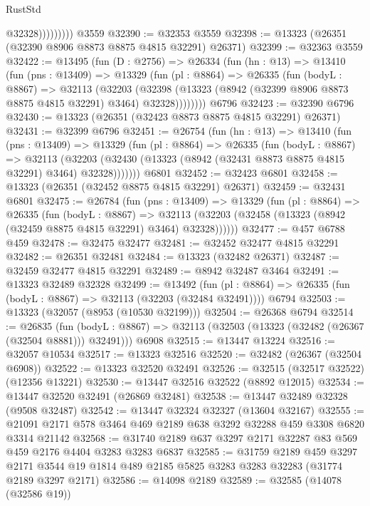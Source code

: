 \begin{lexlean}{RustStd}
\begin{coremodule}
                      @32328)))))))))
    @3559
@32390 := @32353 @3559
@32398 := @13323 (@26351 (@32390 @8906 @8873 @8875 @4815 @32291) @26371)
@32399 := @32363 @3559
@32422 := @13495
    (fun (D : @2756) =>
    @26334
      (fun (hn : @13) =>
      @13410
        (fun (pns : @13409) =>
        @13329
          (fun (pl : @8864) =>
          @26335
            (fun (bodyL : @8867) =>
            @32113
              (@32203
                (@32398 (@13323 (@8942 (@32399 @8906 @8873 @8875 @4815 @32291) @3464) @32328))))))))
    @6796
@32423 := @32390 @6796
@32430 := @13323 (@26351 (@32423 @8873 @8875 @4815 @32291) @26371)
@32431 := @32399 @6796
@32451 := @26754
    (fun (hn : @13) =>
    @13410
      (fun (pns : @13409) =>
      @13329
        (fun (pl : @8864) =>
        @26335
          (fun (bodyL : @8867) =>
          @32113
            (@32203 (@32430 (@13323 (@8942 (@32431 @8873 @8875 @4815 @32291) @3464) @32328)))))))
    @6801
@32452 := @32423 @6801
@32458 := @13323 (@26351 (@32452 @8875 @4815 @32291) @26371)
@32459 := @32431 @6801
@32475 := @26784
    (fun (pns : @13409) =>
    @13329
      (fun (pl : @8864) =>
      @26335
        (fun (bodyL : @8867) =>
        @32113 (@32203 (@32458 (@13323 (@8942 (@32459 @8875 @4815 @32291) @3464) @32328))))))
@32477 := @457 @6788 @459
@32478 := @32475 @32477
@32481 := @32452 @32477 @4815 @32291
@32482 := @26351 @32481
@32484 := @13323 (@32482 @26371)
@32487 := @32459 @32477 @4815 @32291
@32489 := @8942 @32487 @3464
@32491 := @13323 @32489 @32328
@32499 := @13492
    (fun (pl : @8864) => @26335 (fun (bodyL : @8867) => @32113 (@32203 (@32484 @32491))))
    @6794
@32503 := @13323 (@32057 (@8953 (@10530 @32199)))
@32504 := @26368 @6794
@32514 := @26835
    (fun (bodyL : @8867) => @32113 (@32503 (@13323 (@32482 (@26367 (@32504 @8881))) @32491)))
    @6908
@32515 := @13447 @13224
@32516 := @32057 @10534
@32517 := @13323 @32516
@32520 := @32482 (@26367 (@32504 @6908))
@32522 := @13323 @32520 @32491
@32526 := @32515 (@32517 @32522) (@12356 @13221)
@32530 := @13447 @32516 @32522 (@8892 @12015)
@32534 := @13447 @32520 @32491 (@26869 @32481)
@32538 := @13447 @32489 @32328 (@9508 @32487)
@32542 := @13447 @32324 @32327 (@13604 @32167)
@32555 := @21091 @2171 @578 @3464 @469 @2189 @638 @3292 @32288 @459 @3308 @6820 @3314 @21142
@32568 := @31740 @2189 @637 @3297 @2171 @32287 @83 @569 @459 @2176 @4404 @3283 @3283 @6837
@32585 := @31759
    @2189
    @459
    @3297
    @2171
    @3544
    @19
    @1814
    @489
    @2185
    @5825
    @3283
    @3283
    @32283
    (@31774 @2189 @3297 @2171)
@32586 := @14098 @2189
@32589 := @32585 (@14078 (@32586 @19))

\end{coremodule}
\end{lexlean}
